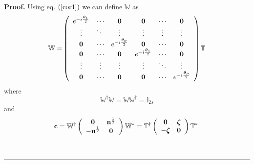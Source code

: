 \documentclass[preprint,aps,showkeys]{revtex4}%
\newenvironment{proof}[1][Proof]{\noindent\textbf{#1.} }{\ \rule{0.5em}{0.5em}}
\begin{document}
\begin{proof}
Using eq. $\left(  \ref{cor1}\right)  $ we can define $\mathbb{W}$ as%
\begin{equation}
\mathbb{W=}\left(
\begin{array}
[c]{cccccc}%
e^{-i\frac{\boldsymbol{\theta}_{1}}{2}} & \mathbf{\cdots} & \mathbf{0} &
\mathbf{0} & \mathbf{\cdots} & \mathbf{0}\\
\mathbf{\vdots} & \mathbf{\ddots} & \mathbf{\vdots} & \mathbf{\vdots} &
\mathbf{\vdots} & \mathbf{\vdots}\\
\mathbf{0} & \mathbf{\cdots} & e^{-i\frac{\boldsymbol{\theta}_{p}}{2}} &
\mathbf{0} & \mathbf{\cdots} & \mathbf{0}\\
\mathbf{0} & \mathbf{\cdots} & \mathbf{0} & e^{-i\frac{\boldsymbol{\theta}_{1}%
}{2}} & \mathbf{\cdots} & \mathbf{0}\\
\mathbf{\vdots} & \mathbf{\vdots} & \mathbf{\vdots} & \mathbf{\vdots} &
\mathbf{\ddots} & \mathbf{\vdots}\\
\mathbf{0} & \mathbf{\cdots} & \mathbf{0} & \mathbf{0} & \mathbf{\cdots} &
e^{-i\frac{\boldsymbol{\theta}_{p}}{2}}%
\end{array}
\right)  \mathbb{T}%
\end{equation}
where
\begin{equation}
\mathbb{W}^{\dagger}\mathbb{W=WW}^{\dagger}\mathbb{=I}_{2s}%
\end{equation}
and
\begin{equation}
\mathbf{c}=\mathbb{W}^{\dagger}\left(
\begin{array}
[c]{cc}%
\mathbf{0} & \mathbf{n}^{\frac{1}{2}}\\
-\mathbf{n}^{\frac{1}{2}} & \mathbf{0}%
\end{array}
\right)  \mathbb{W}^{\ast}=\mathbb{T}^{\dagger}\left(
\begin{array}
[c]{cc}%
\mathbf{0} & \boldsymbol{\zeta}\\
-\boldsymbol{\zeta} & \mathbf{0}%
\end{array}
\right)  \mathbb{T}^{\ast}. \label{cex}%
\end{equation}

\end{proof}
\end{document}
